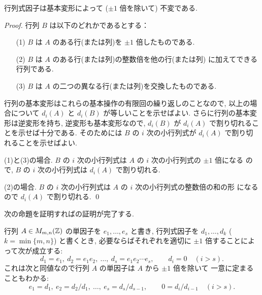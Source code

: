 \documentclass[12pt,twoside]{jarticle}
\begin{document}
\begin{lemma}[行列式因子の基本変形による不変性]
\label{lemma:invariance-det-div}
  行列式因子は基本変形によって ($\pm1$ 倍を除いて) 不変である.
\end{lemma}

\begin{proof}
行列 $B$ は以下のどれかであるとする：
\begin{itemize}
 \item[(1)] $B$ は $A$ のある行(または列)を $\pm1$ 倍したものである.
 \item[(2)] $B$ は $A$ のある行(または列)の整数倍を他の行(または列)
  に加えてできる行列である.
 \item[(3)] $B$ は $A$ の二つの異なる行(または列)を交換したものである.
\end{itemize}
行列の基本変形はこれらの基本操作の有限回の繰り返しのことなので, 
以上の場合について $d_i(A)$ と $d_i(B)$ が等しいことを示せばよい.
さらに行列の基本変形は逆変形を持ち, 逆変形も基本変形なので, 
$d_i(B)$ が $d_i(A)$ で割り切れることを示せば十分である.
そのためには $B$ の $i$ 次の小行列式が $d_i(A)$ で割り切れることを示せばよい.

(1)と(3)の場合. 
$B$ の $i$ 次の小行列式は $A$ の $i$ 次の小行列式の $\pm1$ 倍になる
ので, $B$ の $i$ 次の小行列式は $d_i(A)$ で割り切れる.

(2)の場合. 
$B$ の $i$ 次の小行列式は $A$ の $i$ 次の小行列式の整数倍の和の形
になるので $d_i(A)$ で割り切れる.
\qed
\end{proof}


次の命題を証明すればの証明が完了する.

\begin{prop}[単因子と行列式因子の関係]
\label{prop:elem-div-det-div}
  行列 $A\in M_{m,n}({\mathbb Z})$ の単因子を $e_1,\dots,e_s$ と書き, 
  行列式因子を $d_1,\dots,d_k$ ($k=\min\{m,n\}$) と書くとき, 
  必要ならばそれぞれを適切に $\pm1$ 倍することによって次が成立する:
  \begin{equation*}
    d_1 = e_1,\ d_2 = e_1e_2,\ \dots,\ d_s = e_1e_2\cdots e_s,
    \qquad
    d_i = 0 \quad (i>s).
  \end{equation*}
  これは次と同値なので行列 $A$ の単因子は $A$ から $\pm1$ 倍を除いて
  一意に定まることもわかる:
  \begin{equation*}
    e_1 = d_1,\ e_2 = d_2/d_1,\ \ldots,\ e_s = d_s/d_{s-1},
    \qquad
    0=d_i/d_{i-1} \quad (i>s).
  \end{equation*}
\end{prop}
\end{document}

